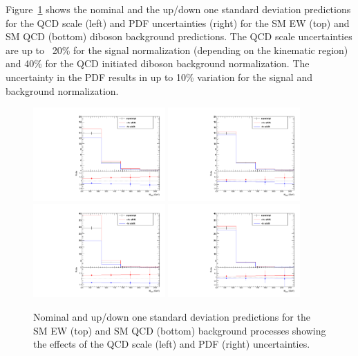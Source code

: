 Figure~\ref{fig:theory} shows the nominal and the up/down one standard deviation predictions for the QCD scale (left) and PDF uncertainties (right) for the SM EW (top) and SM QCD (bottom) diboson background predictions. The QCD scale uncertainties are  up to ~20\% for the signal normalization (depending on the kinematic region) and 40\% for the QCD initiated diboson background normalization. The uncertainty in the PDF results in up to 10\% variation for the signal and background normalization.
%
\begin{figure}[!htbp]
  \begin{center}
    \includegraphics[width=0.45\textwidth]{Plots/systematic/diboson_QCDScale.pdf}
    \includegraphics[width=0.45\textwidth]{Plots/systematic/diboson_PDFScale.pdf}
    \includegraphics[width=0.45\textwidth]{Plots/systematic/VVjjQCD_QCDScale.pdf}
    \includegraphics[width=0.45\textwidth]{Plots/systematic/VVjjQCD_PDFScale.pdf}
    \caption{Nominal and up/down one standard deviation predictions for the SM EW (top) and SM QCD (bottom) background processes showing the effects of the QCD scale (left) and PDF (right) uncertainties.}
    \label{fig:theory}
  \end{center}
\end{figure}

